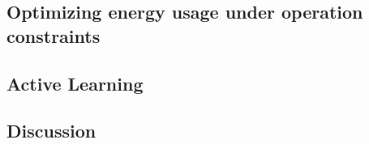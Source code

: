 
\subsection{Optimizing energy usage under operation constraints}
\label{SS:energy_management}


\subsection{Active Learning}

\subsection{Discussion}

